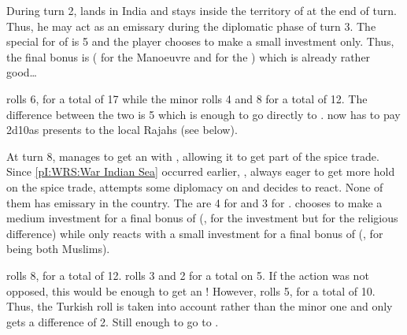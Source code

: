 \begin{exemple}
  During turn 2,  lands in India and stays inside the
  territory of \paysVijayanagar at the end of turn. Thus, he may act as
  an emissary during the diplomatic phase of turn 3. The special \FTI
  for \ROTW of \POR is 5 and the player chooses to make a small
  investment only. Thus, the final bonus is  ( for
  the Manoeuvre and  for the \FTI) which is already rather
  good\ldots

  \POR rolls 6, for a total of 17 while the minor rolls 4 and 8 for a
  total of 12. The difference between the two is 5 which is enough to go
  directly to \dipAT. \POR now has to pay 2d10\ducats as presents to the
  local Rajahs (see below).
\end{exemple}

\begin{exemple}
  At turn 8, \TUR manages to get an \dipAT with \paysAden, allowing it
  to get part of the spice trade. Since \ref{pI:WRS:War Indian Sea}
  occurred earlier, \VEN, always eager to get more hold on the spice
  trade, attempts some diplomacy on \paysAden and \TUR decides to
  react. None of them has emissary in the country. The \FTI are 4 for
  \VEN and 3 for \TUR. \VEN chooses to make a medium investment for a
  final bonus of  (\FTI,  for the investment but
   for the religious difference) while \TUR only reacts with a
  small investment for a final bonus of  (\FTI,  for
  being both Muslims).

  \VEN rolls 8, for a total of 12. \paysAden rolls 3 and 2 for a total
  on 5. If the action was not opposed, this would be enough to get an
  \dipAT! However, \TUR rolls 5, for a total of 10. Thus, the Turkish
  roll is taken into account rather than the minor one and \VEN only
  gets a difference of 2. Still enough to go to \dipFR.
\end{exemple}

